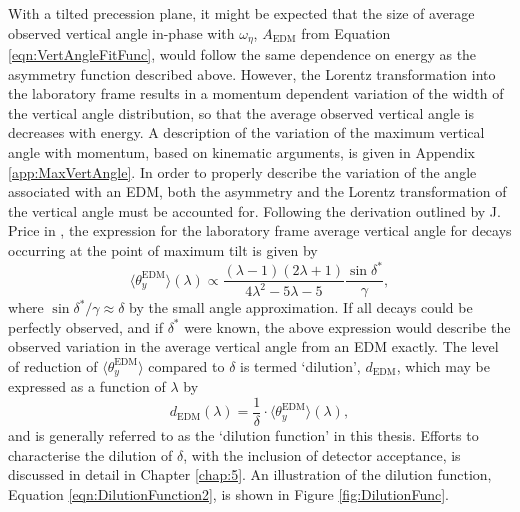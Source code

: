 With a tilted precession plane, it might be expected that the size of average observed vertical angle in-phase with $\omega_{\eta}$, $A_{\text{EDM}}$ from Equation \ref{eqn:VertAngleFitFunc}, would follow the same dependence on energy as the asymmetry function described above. However, the Lorentz transformation into the laboratory frame results in a momentum dependent variation of the width of the vertical angle distribution, so that the average observed vertical angle is decreases with energy. A description of the variation of the maximum vertical angle with momentum, based on kinematic arguments, is given in Appendix \ref{app:MaxVertAngle}. In order to properly describe the variation of the angle associated with an EDM, both the asymmetry and the Lorentz transformation of the vertical angle must be accounted for. Following the derivation outlined by J. Price in \cite{JoeEDMNote}, the expression for the laboratory frame average vertical angle for decays occurring at the point of maximum tilt is given by 
%
\begin{equation}
  \langle {\theta_{y}^{\text{EDM}}} \rangle (\lambda) \propto \frac{(\lambda-1)(2\lambda+1)}{4\lambda^{2}-5\lambda-5} \frac{\sin{\delta^{*}}}{\gamma},
  \label{eqn:DilutionFunction1}
\end{equation} 
%
where $\sin{\delta^{*}}/\gamma \approx \delta$ by the small angle approximation. If all decays could be perfectly observed, and if $\delta^{*}$ were known, the above expression would describe the observed variation in the average vertical angle from an EDM exactly. The level of reduction of $\langle {\theta_{y}^{\text{EDM}}} \rangle $ compared to $\delta$ is termed `dilution', $d_{\text{EDM}}$, which may be expressed as a function of $\lambda$ by 
%
\begin{equation}
  d_{\text{EDM}}(\lambda) = \frac{1}{\delta} \cdot \langle {\theta_{y}^{\text{EDM}}} \rangle(\lambda),
  \label{eqn:DilutionFunction2}
\end{equation} 
%
and is generally referred to as the `dilution function' in this thesis. Efforts to characterise the dilution of $\delta$, with the inclusion of detector acceptance, is discussed in detail in Chapter \ref{chap:5}. An illustration of the dilution function, Equation \ref{eqn:DilutionFunction2}, is shown in Figure \ref{fig:DilutionFunc}.

